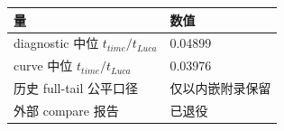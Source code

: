 \begin{tabular}{ll}
\toprule
量 & 数值 \\
\midrule
diagnostic 中位 $t_{time}/t_{Luca}$ & 0.04899 \\
curve 中位 $t_{time}/t_{Luca}$ & 0.03976 \\
历史 full-tail 公平口径 & 仅以内嵌附录保留 \\
外部 compare 报告 & 已退役 \\
\bottomrule
\end{tabular}
